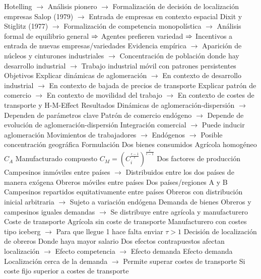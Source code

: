 \documentclass{nuevotema}
\begin{document}
\begin{esquemal}
				\4[] Hotelling
				\4[] $\to$ Análisis pionero
				\4[] $\to$ Formalización de decisión de localización empresas
				\4[] Salop (1979)
				\4[] $\to$ Entrada de empresas en contexto espacial
				\4[] Dixit y Stiglitz (1977)
				\4[] $\to$ Formalización de competencia monopolística
				\4[] $\to$ Análisis formal de equilibrio general
				\4[] $\Rightarrow$ Agentes prefieren variedad
				\4[] $\Rightarrow$ Incentivos a entrada de nuevas empresas/variedades
				\4[] Evidencia empírica
				\4[] $\to$ Aparición de núcleos y cinturones industriales
				\4[] $\to$ Concentración de población donde hay desarrollo industrial
				\4[] $\to$ Trabajo industrial móvil con patrones persistentes
				\4 Objetivos
				\4[] Explicar dinámicas de aglomeración
				\4[] $\to$ En contexto de desarrollo industrial
				\4[] $\to$ En contexto de bajada de precios de transporte
				\4[] Explicar patrón de comercio
				\4[] $\to$ En contexto de movilidad del trabajo
				\4[] $\to$ En contexto de costes de transporte y H-M-Effect
				\4 Resultados
				\4[] Dinámicas de aglomeración-dispersión
				\4[] $\to$ Dependen de parámetros clave
				\4[] Patrón de comercio endógeno
				\4[] $\to$ Depende de evolución de aglomeración-dispersión
				\4[] Integración comercial
				\4[] $\to$ Puede inducir aglomeración
				\4[] Movimientos de trabajadores
				\4[] $\to$ Endógenos
				\4[] $\to$ Posible concentración geográfica
			\3 Formulación
				\4 Dos bienes consumidos
				\4[] Agrícola homogéneo $C_A$
				\4[] Manufacturado compuesto $C_M = \left( C_i^{\frac{\epsilon-1}{\epsilon}} \right)^{\frac{\epsilon}{\epsilon-1}}$
				\4 Dos factores de producción
				\4[] Campesinos inmóviles entre países
				\4[] $\to$ Distribuidos entre los dos países de manera exógena
				\4[] Obreros móviles entre países
				\4 Dos países/regiones A y B
				\4[] Campesinos repartidos equitativamente entre países
				\4[] Obreros con distribución inicial arbitraria
				\4[] $\to$ Sujeto a variación endógena
				\4 Demanda de bienes
				\4[] Obreros y campesinos iguales demandas
				\4[] $\to$ Se distribuye entre agrícola y manufacturero
				\4 Coste de transporte
				\4[] Agrícola sin coste de transporte
				\4[] Manufacturero con costes tipo iceberg
				\4[] $\to$ Para que llegue 1 hace falta enviar $\tau > 1$
				\4 Decisión de localización de obreros
				\4[] Donde haya mayor salario
				\4[] Dos efectos contrapuestos afectan localización
				\4[] $\to$ Efecto competencia
				\4[] $\to$ Efecto demanda
				\4 Efecto demanda
				\4[] Localización cerca de la demanda
				\4[] $\to$ Permite superar costes de transporte
				\4[] Si coste fijo superior a costes de transporte

\end{esquemal}
\end{document}
